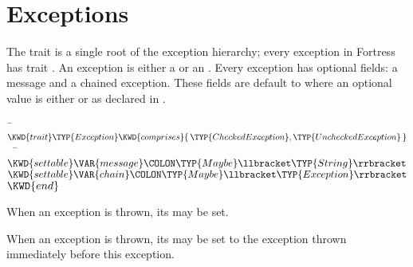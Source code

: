 %
%
%
%

\chapter{Exceptions}


The trait  is a single root of the exception hierarchy;
every exception in Fortress has trait .
An exception is either a  or an
.
Every exception has optional fields: a message and a chained exception.
These fields are default to 
where an optional value  is either  or
 as declared in .


\begin{Fortress}
{\tt~}\pushtabs\=\+\( \KWD{trait} \TYP{Exception} \KWD{comprises} \{\,\TYP{CheckedException}, \TYP{UncheckedException}\,\}\)\\
{\tt~~}\pushtabs\=\+\(   \KWD{settable} \VAR{message}\COLON \TYP{Maybe}\llbracket\TYP{String}\rrbracket\)\\
\(   \KWD{settable} \VAR{chain}\COLON \TYP{Maybe}\llbracket\TYP{Exception}\rrbracket\)\-\\\poptabs
\( \KWD{end}\)\-\\\poptabs
\end{Fortress}


When an exception is thrown, its  may be set. 


When an exception is thrown, its  may be set to the exception
thrown immediately before this exception.


